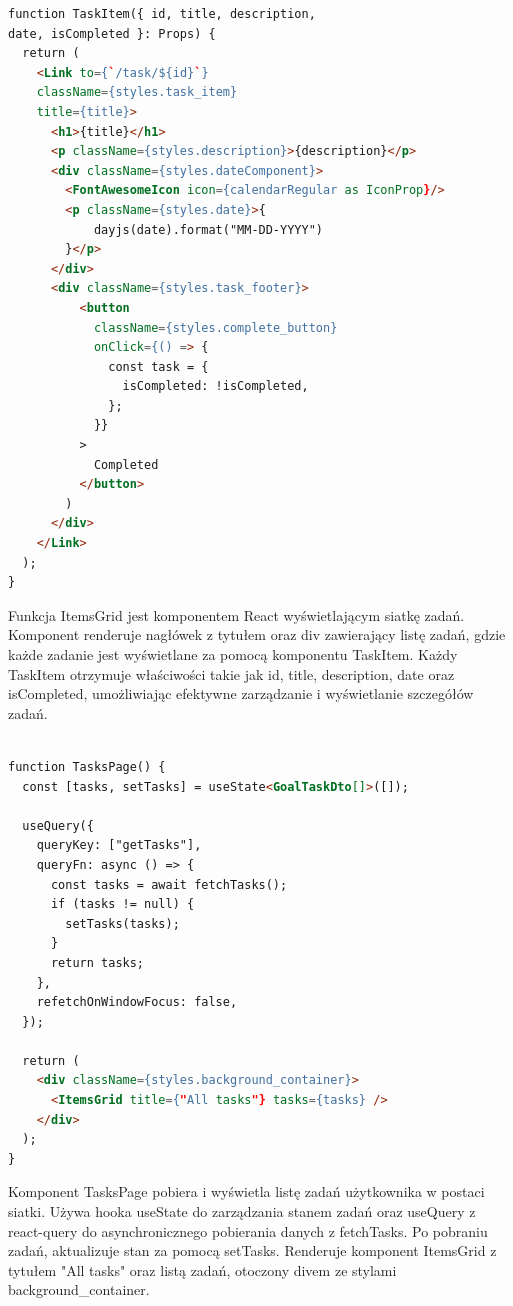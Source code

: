 \begin{lstlisting}[language=html, caption=TaskItem example]
function TaskItem({ id, title, description,
date, isCompleted }: Props) {
  return (
    <Link to={`/task/${id}`} 
    className={styles.task_item} 
    title={title}>
      <h1>{title}</h1>
      <p className={styles.description}>{description}</p>
      <div className={styles.dateComponent}>
        <FontAwesomeIcon icon={calendarRegular as IconProp}/>
        <p className={styles.date}>{
            dayjs(date).format("MM-DD-YYYY")
        }</p>
      </div>
      <div className={styles.task_footer}>
          <button
            className={styles.complete_button}
            onClick={() => {
              const task = {
                isCompleted: !isCompleted,
              };
            }}
          >
            Completed
          </button>
        )
      </div>
    </Link>
  );
}
\end{lstlisting}
Funkcja ItemsGrid jest komponentem React wyświetlającym siatkę zadań. Komponent renderuje nagłówek z tytułem oraz div zawierający listę zadań, gdzie każde zadanie jest wyświetlane za pomocą komponentu TaskItem. Każdy TaskItem otrzymuje właściwości takie jak id, title, description, date oraz isCompleted, umożliwiając efektywne zarządzanie i wyświetlanie szczegółów zadań.
\\

\\

\begin{lstlisting}[language=html, caption=TasksPage example]
function TasksPage() {
  const [tasks, setTasks] = useState<GoalTaskDto[]>([]);

  useQuery({
    queryKey: ["getTasks"],
    queryFn: async () => {
      const tasks = await fetchTasks();
      if (tasks != null) {
        setTasks(tasks);
      }
      return tasks;
    },
    refetchOnWindowFocus: false,
  });

  return (
    <div className={styles.background_container}>
      <ItemsGrid title={"All tasks"} tasks={tasks} />
    </div>
  );
}
\end{lstlisting}
Komponent TasksPage pobiera i wyświetla listę zadań użytkownika w postaci siatki. Używa hooka useState do zarządzania stanem zadań oraz useQuery z react-query do asynchronicznego pobierania danych z fetchTasks. Po pobraniu zadań, aktualizuje stan za pomocą setTasks. Renderuje komponent ItemsGrid z tytułem "All tasks" oraz listą zadań, otoczony divem ze stylami background\_container.
\\

